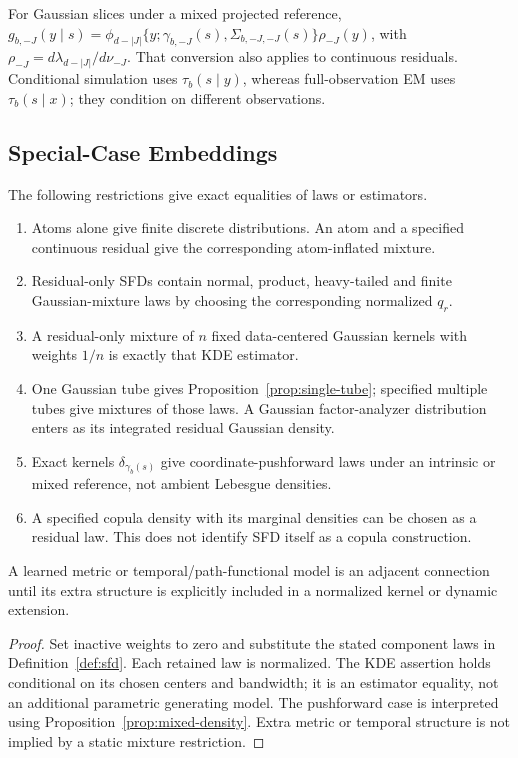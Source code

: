 For Gaussian slices under a mixed projected reference,
$g_{b,-J}(y\mid s)=\phi_{d-|J|}\{y;\gamma_{b,-J}(s),
\Sigma_{b,-J,-J}(s)\}\rho_{-J}(y)$, with
$\rho_{-J}=d\lambda_{d-|J|}/d\nu_{-J}$. That conversion also applies to
continuous residuals. Conditional simulation uses $\tau_b(s\mid y)$,
whereas full-observation EM uses $\tau_b(s\mid x)$; they condition on
different observations.

\subsection{Special-Case Embeddings}
\label{app:special-cases}
\begin{proposition}
\label{prop:special-cases}
The following restrictions give exact equalities of laws or estimators.
\begin{enumerate}
\item Atoms alone give finite discrete distributions. An atom and a specified
continuous residual give the corresponding atom-inflated mixture.
\item Residual-only SFDs contain normal, product, heavy-tailed and finite
Gaussian-mixture laws by choosing the corresponding normalized $q_r$.
\item A residual-only mixture of $n$ fixed data-centered Gaussian kernels
with weights $1/n$ is exactly that KDE estimator.
\item One Gaussian tube gives Proposition~\ref{prop:single-tube}; specified
multiple tubes give mixtures of those laws. A Gaussian factor-analyzer
distribution enters as its integrated residual Gaussian density.
\item Exact kernels $\delta_{\gamma_b(s)}$ give coordinate-pushforward
laws under an intrinsic or mixed reference, not ambient Lebesgue densities.
\item A specified copula density with its marginal densities can be chosen
as a residual law. This does not identify SFD itself as a copula construction.
\end{enumerate}
A learned metric or temporal/path-functional model is an adjacent connection
until its extra structure is explicitly included in a normalized kernel or
dynamic extension.
\end{proposition}
\begin{proof}
Set inactive weights to zero and substitute the stated component laws in
Definition~\ref{def:sfd}. Each retained law is normalized. The KDE assertion
holds conditional on its chosen centers and bandwidth; it is an estimator
equality, not an additional parametric generating model. The pushforward
case is interpreted using Proposition~\ref{prop:mixed-density}. Extra
metric or temporal structure is not implied by a static mixture restriction.
\end{proof}
